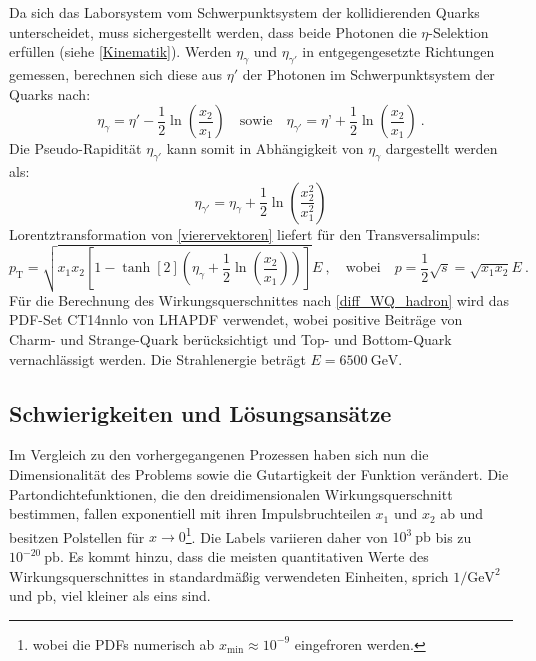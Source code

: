 Da sich das Laborsystem vom Schwerpunktsystem der kollidierenden Quarks unterscheidet, muss sichergestellt werden, dass beide Photonen die $\eta$-Selektion erfüllen (siehe \textsf{\autoref{Kinematik}}). Werden $\eta_{\gamma}$ und $\eta_{\gamma'}$ in entgegengesetzte Richtungen gemessen, berechnen sich diese aus $\eta'$ der Photonen im Schwerpunktsystem der Quarks nach: 
\begin{equation}
\eta_{\gamma} = \eta' -\frac{1}{2}\ln(\frac{x_2}{x_1}) \quad \text{sowie} \quad \eta_{\gamma'} = \eta’ + \frac{1}{2}\ln(\frac{x_2}{x_1})~.
\end{equation}
Die Pseudo-Rapidität $\eta_{\gamma'}$ kann somit in Abhängigkeit von $\eta_{\gamma}$ dargestellt werden als:
\begin{equation} 
\eta_{\gamma'} = \eta_{\gamma} + \frac{1}{2}  \ln(\frac{x_2^2}{x_1^2})
\end{equation}
Lorentztransformation von \textsf{\autoref{vierervektoren}} liefert für den Transversalimpuls:
\begin{equation}
	p_\text{T} = \sqrt{x_1 x_2 \left[1-\tanh[2](\eta_{\gamma} + \frac{1}{2}\ln(\frac{x_2}{x_1}))\right]}E~, \quad \text{wobei} \quad p = \frac{1}{2} \sqrt{s} = \sqrt{x_1 
	x_2} E~.
	\label{p_T}
\end{equation}
Für die Berechnung des Wirkungsquerschnittes nach \textsf{\autoref{diff_WQ_hadron}} wird das PDF-Set CT14nnlo von LHAPDF \cite{LHAPDF} verwendet, wobei positive Beiträge von Charm- und Strange-Quark berücksichtigt und Top- und Bottom-Quark vernachlässigt werden. Die Strahlenergie beträgt $E = 6500~\text{GeV}$.
\subsection{Schwierigkeiten und Lösungsansätze} 
Im Vergleich zu den vorhergegangenen Prozessen haben sich nun die Dimensionalität des Problems sowie die Gutartigkeit der Funktion verändert. Die Partondichtefunktionen, die den dreidimensionalen Wirkungsquerschnitt bestimmen, fallen exponentiell mit ihren Impulsbruchteilen $x_1$ und $x_2$ ab und besitzen Polstellen für $x \rightarrow 0$\footnote{wobei die PDFs numerisch ab $x_{\text{min}} \approx 10^{-9}$ eingefroren werden.}. Die Labels variieren daher von $10^{3}~\text{pb}$ bis zu $10^{-20}~\text{pb}$. Es kommt hinzu, dass die meisten quantitativen Werte des Wirkungsquerschnittes in standardmäßig verwendeten Einheiten, sprich $1/\text{GeV}^2$ und $\text{pb}$, viel kleiner als eins sind.

